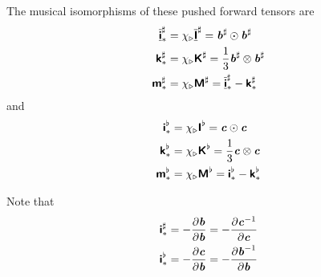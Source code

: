 The musical isomorphisms of these pushed forward tensors are
\begin{align}
    \overline{\underline{\boldsymbol{\mathsf{ i }}}}  ^{\sharp}_{*}&= \chi_{\triangleright}   \overline{\underline{\boldsymbol{\mathsf{ I }}}}  ^{\sharp}  =  \boldsymbol{\mathit{b}}^{\sharp}  \odot  \boldsymbol{\mathit{b}}^{\sharp}  \\
    \boldsymbol{\mathsf{ k }}  ^{\sharp}_{*}&= \chi_{\triangleright}   \boldsymbol{\mathsf{ K }}  ^{\sharp}  =\dfrac{1}{3}  \boldsymbol{\mathit{b}}^{\sharp}  \otimes  \boldsymbol{\mathit{b}}^{\sharp}  \\
    \boldsymbol{\mathsf{ m }}  ^{\sharp}_{*}&= \chi_{\triangleright}   \boldsymbol{\mathsf{ M }}  ^{\sharp}  =  \overline{\underline{\boldsymbol{\mathsf{ i }}}}  ^{\sharp}_{*}-  \boldsymbol{\mathsf{ k }}  ^{\sharp}_{*}
\end{align}
and
\begin{align}
  \boldsymbol{\mathsf{i}}^{\flat}_{*}&= \chi_{\triangleright}\boldsymbol{\mathsf{I}}^{\flat} = \boldsymbol{\mathit{c}} \odot \boldsymbol{\mathit{c}} \\
  \boldsymbol{\mathsf{k}}^{\flat}_{*}&= \chi_{\triangleright}\boldsymbol{\mathsf{K}}^{\flat} =\dfrac{1}{3} \boldsymbol{\mathit{c}} \otimes \boldsymbol{\mathit{c}} \\
  \boldsymbol{\mathsf{m}}^{\flat}_{*}&= \chi_{\triangleright}\boldsymbol{\mathsf{M}}^{\flat} =\boldsymbol{\mathsf{i}}^{\flat}_{*}-\boldsymbol{\mathsf{k}}^{\flat}_{*}
\end{align}

Note that
\begin{align}
  \boldsymbol{\mathsf{i}}^{\sharp}_{*}&=- \dfrac{\partial \boldsymbol{\mathit{b}}}{\partial \boldsymbol{\mathit{b}}} =- \dfrac{\partial {\ensuremath{\boldsymbol{\mathit{c}}}}^{-1}}{\partial \boldsymbol{\mathit{c}}}  \\
  \boldsymbol{\mathsf{i}}^{\flat}_{*}&=- \dfrac{\partial \boldsymbol{\mathit{c}}}{\partial \boldsymbol{\mathit{b}}} =- \dfrac{\partial {\ensuremath{\boldsymbol{\mathit{b}}}}^{-1}}{\partial \boldsymbol{\mathit{b}}}  \\
\end{align}

